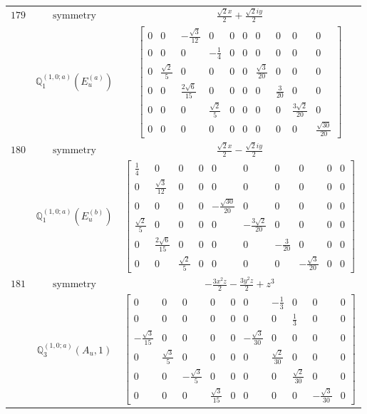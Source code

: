\documentclass[fleqn,8pt,landscape]{jsarticle}
\begin{document}
\begin{longtable}{ccc}
$ 179 $ & $ \text{symmetry} $ & $ \frac{\sqrt{2} x}{2} + \frac{\sqrt{2} i y}{2} $ \\
$  $ & $ \mathbb{Q}_{1}^{(1,0;a)}(E_{u}^{(a)}) $ & $ \begin{bmatrix} 0 & 0 & - \frac{\sqrt{3}}{12} & 0 & 0 & 0 & 0 & 0 & 0 & 0 \\ 0 & 0 & 0 & - \frac{1}{4} & 0 & 0 & 0 & 0 & 0 & 0 \\ 0 & \frac{\sqrt{2}}{5} & 0 & 0 & 0 & 0 & \frac{\sqrt{3}}{20} & 0 & 0 & 0 \\ 0 & 0 & \frac{2 \sqrt{6}}{15} & 0 & 0 & 0 & 0 & \frac{3}{20} & 0 & 0 \\ 0 & 0 & 0 & \frac{\sqrt{2}}{5} & 0 & 0 & 0 & 0 & \frac{3 \sqrt{2}}{20} & 0 \\ 0 & 0 & 0 & 0 & 0 & 0 & 0 & 0 & 0 & \frac{\sqrt{30}}{20} \end{bmatrix} $ \\ \hline
$ 180 $ & $ \text{symmetry} $ & $ \frac{\sqrt{2} x}{2} - \frac{\sqrt{2} i y}{2} $ \\
$  $ & $ \mathbb{Q}_{1}^{(1,0;a)}(E_{u}^{(b)}) $ & $ \begin{bmatrix} \frac{1}{4} & 0 & 0 & 0 & 0 & 0 & 0 & 0 & 0 & 0 \\ 0 & \frac{\sqrt{3}}{12} & 0 & 0 & 0 & 0 & 0 & 0 & 0 & 0 \\ 0 & 0 & 0 & 0 & - \frac{\sqrt{30}}{20} & 0 & 0 & 0 & 0 & 0 \\ \frac{\sqrt{2}}{5} & 0 & 0 & 0 & 0 & - \frac{3 \sqrt{2}}{20} & 0 & 0 & 0 & 0 \\ 0 & \frac{2 \sqrt{6}}{15} & 0 & 0 & 0 & 0 & - \frac{3}{20} & 0 & 0 & 0 \\ 0 & 0 & \frac{\sqrt{2}}{5} & 0 & 0 & 0 & 0 & - \frac{\sqrt{3}}{20} & 0 & 0 \end{bmatrix} $ \\ \hline
$ 181 $ & $ \text{symmetry} $ & $ - \frac{3 x^{2} z}{2} - \frac{3 y^{2} z}{2} + z^{3} $ \\
$  $ & $ \mathbb{Q}_{3}^{(1,0;a)}(A_{u},1) $ & $ \begin{bmatrix} 0 & 0 & 0 & 0 & 0 & 0 & - \frac{1}{3} & 0 & 0 & 0 \\ 0 & 0 & 0 & 0 & 0 & 0 & 0 & \frac{1}{3} & 0 & 0 \\ - \frac{\sqrt{3}}{15} & 0 & 0 & 0 & 0 & - \frac{\sqrt{3}}{30} & 0 & 0 & 0 & 0 \\ 0 & \frac{\sqrt{3}}{5} & 0 & 0 & 0 & 0 & \frac{\sqrt{2}}{30} & 0 & 0 & 0 \\ 0 & 0 & - \frac{\sqrt{3}}{5} & 0 & 0 & 0 & 0 & \frac{\sqrt{2}}{30} & 0 & 0 \\ 0 & 0 & 0 & \frac{\sqrt{3}}{15} & 0 & 0 & 0 & 0 & - \frac{\sqrt{3}}{30} & 0 \end{bmatrix} $ \\ \hline

\end{longtable}
\end{document}
